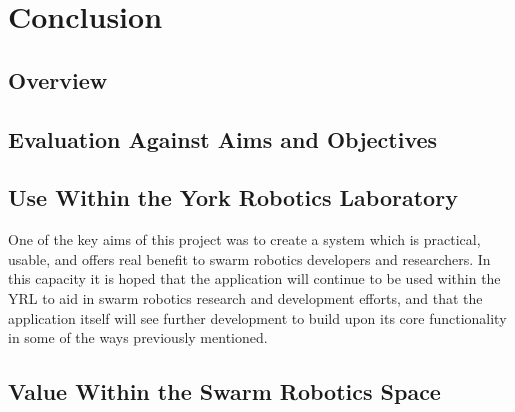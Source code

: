 
\chapter[Conclusion]{Conclusion} %

\label{Chapter12} %


\section{Overview}



\section{Evaluation Against Aims and Objectives}



\section{Use Within the York Robotics Laboratory}

One of the key aims of this project was to create a system which is practical, usable, and offers real benefit to swarm robotics developers and researchers. In this capacity it is hoped that the application will continue to be used within the YRL to aid in swarm robotics research and development efforts, and that the application itself will see further development to build upon its core functionality in some of the ways previously mentioned.


\section{Value Within the Swarm Robotics Space}


